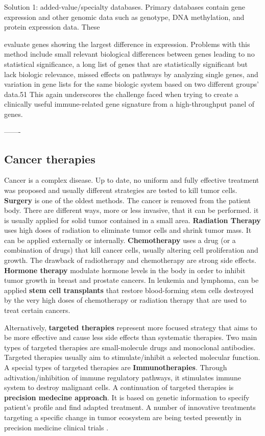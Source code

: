 \documentclass[12pt,]{book}
\theoremstyle{definition}
\theoremstyle{definition}
\theoremstyle{definition}
\theoremstyle{remark}
\begin{document}
Solution 1: added-value/specialty databases. Primary databases contain
gene expression and other genomic data such as genotype, DNA
methylation, and protein expression data. These

evaluate genes showing the largest difference in expression. Problems
with this method include small relevant biological differences between
genes leading to no statistical significance, a long list of genes that
are statistically significant but lack biologic relevance, missed
effects on pathways by analyzing single genes, and variation in gene
lists for the same biologic system based on two different groups'
data.51 This again underscores the challenge faced when trying to create
a clinically useful immune-related gene signature from a high-throughput
panel of genes.

\citet{Lyons2017}

-------

\hypertarget{cancer_Therapies}{%
\subsection{Cancer therapies}\label{cancer_Therapies}}

Cancer is a complex disease. Up to date, no uniform and fully effective
treatment was proposed and usually different strategies are tested to
kill tumor cells. \textbf{Surgery} is one of the oldest methods. The
cancer is removed from the patient body. There are different ways, more
or less invasive, that it can be performed. it is usually applied for
solid tumor contained in a small area. \textbf{Radiation Therapy} uses
high doses of radiation to eliminate tumor cells and shrink tumor mass.
It can be applied externally or internally. \textbf{Chemotherapy} uses a
drug (or a combination of drugs) that kill cancer cells, usually
altering cell proliferation and growth. The drawback of radiotherapy and
chemotherapy are strong side effects. \textbf{Hormone therapy } modulate
hormone levels in the body in order to inhibit tumor growth in breast
and prostate cancers. In leukemia and lymphoma, can be applied
\textbf{stem cell transplants} that restore blood-forming stem cells
destroyed by the very high doses of chemotherapy or radiation therapy
that are used to treat certain cancers.

Alternatively, \textbf{targeted therapies} represent more focused
strategy that aims to be more effective and cause less side effects than
systematic therapies. Two main types of targeted therapies are
small-molecule drugs and monoclonal antibodies. Targeted therapies
usually aim to stimulate/inhibit a selected molecular function. A
special types of targeted therapies are \textbf{Immunotherapies}.
Through adtivation/inhibition of immune regulatory pathways, it
stimulates immune system to destroy malignant cells. A continuation of
targeted therapies is \textbf{precision medecine approach}. It is based
on genetic information to specify patient's profile and find adapted
treatment. A number of innovative treatments targeting a specific change
in tumor ecosystem are being tested presently in precision medicine
clinical trials \citep{NCI2018}.
\end{document}
